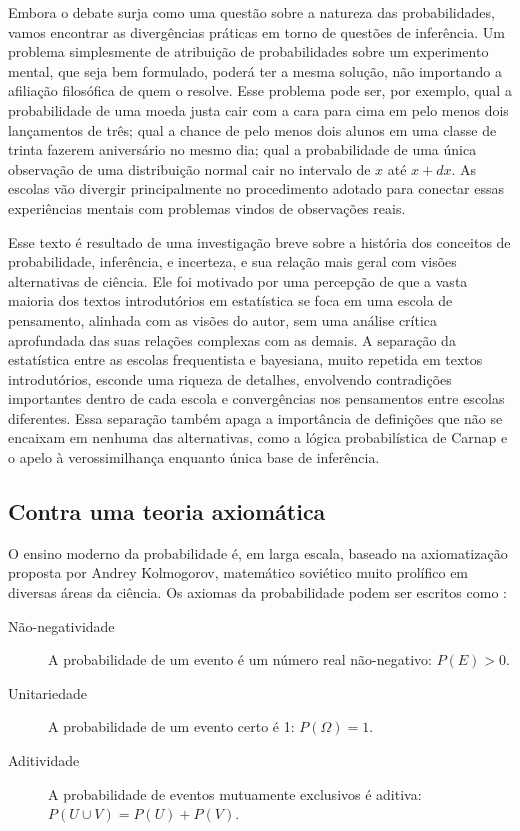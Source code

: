 \documentclass[12pt,a4paper]{article}
\begin{document}
Embora o debate surja como uma questão sobre a natureza das probabilidades, vamos encontrar as divergências práticas
em torno de questões de inferência. Um problema simplesmente de atribuição de probabilidades sobre um experimento mental,
que seja bem formulado, poderá ter a mesma solução, não importando a afiliação filosófica de quem o resolve. Esse problema 
pode ser, por exemplo, qual a probabilidade de uma moeda justa cair com a cara para cima em pelo menos dois lançamentos de 
três; qual a chance de pelo menos dois alunos em uma classe de trinta fazerem aniversário no mesmo dia; qual a probabilidade 
de uma única observação de uma distribuição normal cair no intervalo de $x$ até $x+dx$. As escolas vão divergir principalmente
no procedimento adotado para conectar essas experiências mentais com problemas vindos de observações reais. 

Esse texto é resultado de uma investigação breve sobre a história dos conceitos de probabilidade, inferência, e incerteza,
e sua relação mais geral com visões alternativas de ciência. Ele foi motivado por uma percepção de que a vasta maioria dos
textos introdutórios em estatística se foca em uma escola de pensamento, alinhada com as visões do autor, sem uma análise crítica
aprofundada das suas relações complexas com as demais. A separação da estatística entre as escolas frequentista e bayesiana,
muito repetida em textos introdutórios, esconde uma riqueza de detalhes, envolvendo contradições importantes dentro de cada
escola e convergências nos pensamentos entre escolas diferentes. Essa separação também apaga a importância de definições que
não se encaixam em nenhuma das alternativas, como a lógica probabilística de Carnap e o apelo à verossimilhança enquanto 
única base de inferência.

\subsection{Contra uma teoria axiomática}\label{sec:axiomatica}
O ensino moderno da probabilidade é, em larga escala, baseado na axiomatização proposta por Andrey Kolmogorov, matemático
soviético muito prolífico em diversas áreas da ciência. Os axiomas da probabilidade podem ser escritos como \cite{Morettin09}:

\begin{description}
	\item[Não-negatividade] A probabilidade de um evento é um número real não-negativo: $P(E) > 0$.
	\item[Unitariedade] A probabilidade de um evento certo é 1: $P(\Omega) = 1$.
	\item[Aditividade] A probabilidade de eventos mutuamente exclusivos é aditiva: $P(U \cup V) = P(U)+P(V)$.
\end{description}
\end{document}
